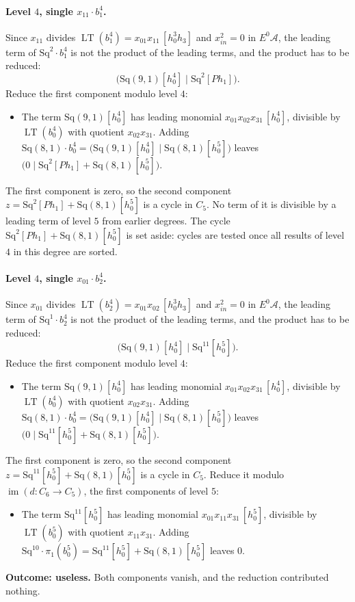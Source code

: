 \documentclass[11pt]{article}
\newcommand{\Sq}{\mathrm{Sq}}
\newcommand{\A}{\mathcal{A}}
\DeclareMathOperator{\LT}{LT}
\begin{document}
\paragraph{Level $4$, single $x_{11}\cdot b^{4}_{1}$.} Since $x_{11}$ divides $\LT(b^{4}_{1}) = x_{01}x_{11}\,[h_0^3h_3]$ and $x_{in}^2 = 0$ in $E^0\A$, the leading term of $\Sq^{2}\cdot b^{4}_{1}$ is not the product of the leading terms, and the product has to be reduced:
\[\bigl(\Sq(9,1)[h_0^4] \;\big|\; \Sq^{2}[Ph_1]\bigr).\]
Reduce the first component modulo level $4$:
\begin{itemize}
\item The term $\Sq(9,1)[h_0^4]$ has leading monomial $x_{01}x_{02}x_{31}\,[h_0^4]$, divisible by $\LT(b^{4}_{0})$ with quotient $x_{02}x_{31}$. Adding $\Sq(8,1)\cdot b^{4}_{0} = \bigl(\Sq(9,1)[h_0^4] \;\big|\; \Sq(8,1)[h_0^5]\bigr)$ leaves $\bigl(0 \;\big|\; \Sq^{2}[Ph_1] + \Sq(8,1)[h_0^5]\bigr)$.
\end{itemize}
The first component is zero, so the second component $z = \Sq^{2}[Ph_1] + \Sq(8,1)[h_0^5]$ is a cycle in $C_{5}$.
No term of it is divisible by a leading term of level $5$ from earlier degrees.
The cycle $\Sq^{2}[Ph_1] + \Sq(8,1)[h_0^5]$ is set aside: cycles are tested once all results of level $4$ in this degree are sorted.
\medskip
\paragraph{Level $4$, single $x_{01}\cdot b^{4}_{2}$.} Since $x_{01}$ divides $\LT(b^{4}_{2}) = x_{01}x_{02}\,[h_0^3h_3]$ and $x_{in}^2 = 0$ in $E^0\A$, the leading term of $\Sq^{1}\cdot b^{4}_{2}$ is not the product of the leading terms, and the product has to be reduced:
\[\bigl(\Sq(9,1)[h_0^4] \;\big|\; \Sq^{11}[h_0^5]\bigr).\]
Reduce the first component modulo level $4$:
\begin{itemize}
\item The term $\Sq(9,1)[h_0^4]$ has leading monomial $x_{01}x_{02}x_{31}\,[h_0^4]$, divisible by $\LT(b^{4}_{0})$ with quotient $x_{02}x_{31}$. Adding $\Sq(8,1)\cdot b^{4}_{0} = \bigl(\Sq(9,1)[h_0^4] \;\big|\; \Sq(8,1)[h_0^5]\bigr)$ leaves $\bigl(0 \;\big|\; \Sq^{11}[h_0^5] + \Sq(8,1)[h_0^5]\bigr)$.
\end{itemize}
The first component is zero, so the second component $z = \Sq^{11}[h_0^5] + \Sq(8,1)[h_0^5]$ is a cycle in $C_{5}$.
Reduce it modulo $\operatorname{im}(d\colon C_{6}\to C_{5})$, the first components of level $5$:
\begin{itemize}
\item The term $\Sq^{11}[h_0^5]$ has leading monomial $x_{01}x_{11}x_{31}\,[h_0^5]$, divisible by $\LT(b^{5}_{0})$ with quotient $x_{11}x_{31}$. Adding $\Sq^{10}\cdot \pi_1(b^{5}_{0}) = \Sq^{11}[h_0^5] + \Sq(8,1)[h_0^5]$ leaves $0$.
\end{itemize}
\textbf{Outcome: useless.} Both components vanish, and the reduction contributed nothing.
\medskip
\end{document}
